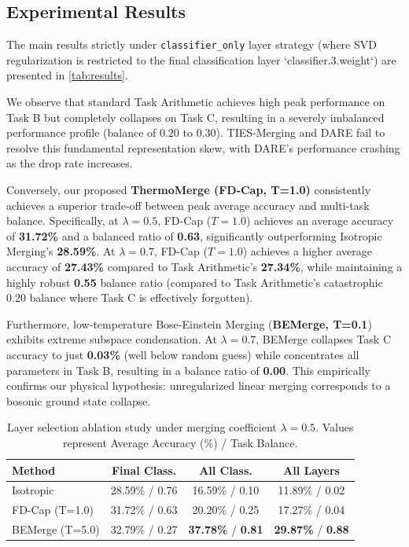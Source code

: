 \documentclass{article}
\theoremstyle{plain}
\theoremstyle{definition}
\theoremstyle{remark}
\begin{document}
\subsection{Experimental Results}
The main results strictly under \texttt{classifier\_only} layer strategy (where SVD regularization is restricted to the final classification layer `classifier.3.weight`) are presented in \cref{tab:results}.

We observe that standard Task Arithmetic achieves high peak performance on Task B but completely collapses on Task C, resulting in a severely imbalanced performance profile (balance of $0.20$ to $0.30$). TIES-Merging and DARE fail to resolve this fundamental representation skew, with DARE's performance crashing as the drop rate increases.

Conversely, our proposed \textbf{ThermoMerge (FD-Cap, T=1.0)} consistently achieves a superior trade-off between peak average accuracy and multi-task balance. Specifically, at $\lambda = 0.5$, FD-Cap ($T=1.0$) achieves an average accuracy of \textbf{31.72\%} and a balanced ratio of \textbf{0.63}, significantly outperforming Isotropic Merging's \textbf{28.59\%}. At $\lambda = 0.7$, FD-Cap ($T=1.0$) achieves a higher average accuracy of \textbf{27.43\%} compared to Task Arithmetic's \textbf{27.34\%}, while maintaining a highly robust \textbf{0.55} balance ratio (compared to Task Arithmetic's catastrophic $0.20$ balance where Task C is effectively forgotten).

Furthermore, low-temperature Bose-Einstein Merging (\textbf{BEMerge, T=0.1}) exhibits extreme subspace condensation. At $\lambda = 0.7$, BEMerge collapses Task C accuracy to just \textbf{0.03\%} (well below random guess) while concentrates all parameters in Task B, resulting in a balance ratio of \textbf{0.00}. This empirically confirms our physical hypothesis: unregularized linear merging corresponds to a bosonic ground state collapse.

\begin{table}[t]
\caption{Layer selection ablation study under merging coefficient $\lambda = 0.5$. Values represent Average Accuracy (\%) / Task Balance.}
\label{tab:ablation}
\vskip 0.1in
\begin{center}
\begin{scriptsize}
\setlength{\tabcolsep}{3pt}
\begin{tabular}{lccc}
\toprule
Method & Final Class. & All Class. & All Layers \\
\midrule
Isotropic & 28.59\% / 0.76 & 16.59\% / 0.10 & 11.89\% / 0.02 \\
FD-Cap (T=1.0) & 31.72\% / 0.63 & 20.20\% / 0.25 & 17.27\% / 0.04 \\
BEMerge (T=5.0) & 32.79\% / 0.27 & \textbf{37.78\%} / \textbf{0.81} & \textbf{29.87\%} / \textbf{0.88} \\
\bottomrule
\end{tabular}
\end{scriptsize}
\end{center}
\vskip -0.1in
\end{table}
\end{document}
